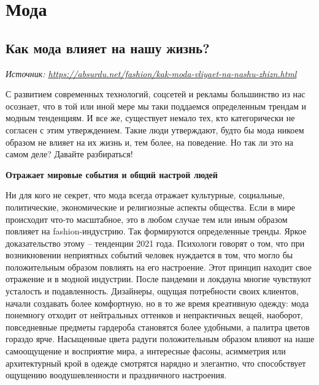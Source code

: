 \chapter{Мода}

\section{Как мода влияет на нашу жизнь?}

\textit{Источник: \url{https://absurdu.net/fashion/kak-moda-vliyaet-na-nashu-zhizn.html}}

С развитием современных технологий, соцсетей и рекламы большинство из нас осознает, что в той или иной мере мы таки поддаемся определенным трендам и модным тенденциям. И все же, существует немало тех, кто категорически не согласен с этим утверждением. Такие люди утверждают, будто бы мода никоем образом не влияет на их жизнь и, тем более, на поведение. Но так ли это на самом деле? Давайте разбираться!

\textbf{Отражает мировые события и общий настрой людей}

Ни для кого не секрет, что мода всегда отражает культурные, социальные, политические, экономические и религиозные аспекты общества. Если в мире происходит что-то масштабное, это в любом случае тем или иным образом повлияет на fashion-индустрию. Так формируются определенные тренды. Яркое доказательство этому – тенденции 2021 года. Психологи говорят о том, что при возникновении неприятных событий человек нуждается в том, что могло бы положительным образом повлиять на его настроение. Этот принцип находит свое отражение и в модной индустрии. После пандемии и локдауна многие чувствуют усталость и подавленность. Дизайнеры, ощущая потребности своих клиентов, начали создавать более комфортную, но в то же время креативную одежду: мода понемногу отходит от нейтральных оттенков и непрактичных вещей, наоборот, повседневные предметы гардероба становятся более удобными, а палитра цветов гораздо ярче. Насыщенные цвета радуги положительным образом влияют на наше самоощущение и восприятие мира, а интересные фасоны, асимметрия или архитектурный крой в одежде смотрятся нарядно и элегантно, что способствует ощущению воодушевленности и праздничного настроения.

